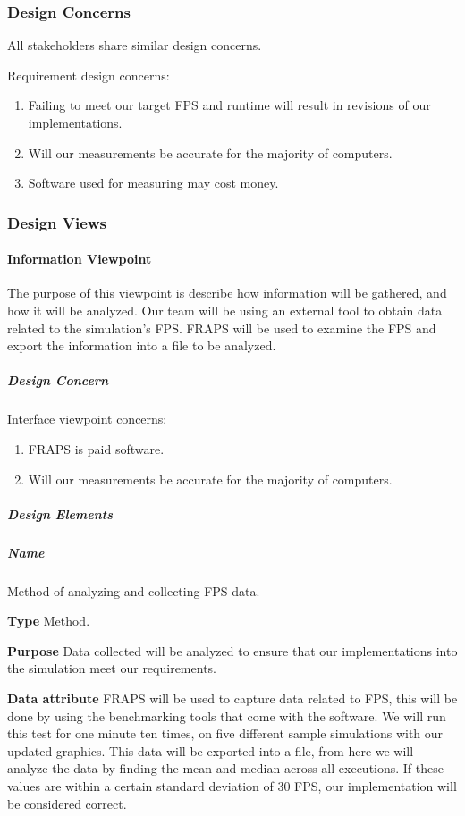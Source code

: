 \begin{flushleft}
\subsubsection{Design Concerns}
All stakeholders share similar design concerns.

Requirement design concerns:
\begin{enumerate}
\item Failing to meet our target FPS and runtime will result in revisions of our implementations.
\item Will our measurements be accurate for the majority of computers.
\item Software used for measuring may cost money.
\end{enumerate}

\newpage

\subsubsection{Design Views}
\paragraph{Information Viewpoint}
The purpose of this viewpoint is describe how information will be gathered, and how it will be analyzed.
Our team will be using an external tool to obtain data related to the simulation's FPS.
 FRAPS will be used to examine the FPS and export the information into a file to be analyzed.

\subparagraph{Design Concern}
Interface viewpoint concerns:
\begin{enumerate}
\item FRAPS is paid software.
\item Will our measurements be accurate for the majority of computers.
\end{enumerate}

\subparagraph{Design Elements}
\subparagraph{Name}
Method of analyzing and collecting FPS data.

\textbf{Type}
Method.

\textbf{Purpose}
Data collected will be analyzed to ensure that our implementations into the simulation meet our requirements.

\textbf{Data attribute}
FRAPS will be used to capture data related to FPS, this will be done by using the benchmarking tools that come with the software.
We will run this test for one minute ten times, on five different sample simulations with our updated graphics.
This data will be exported into a file, from here we will analyze the data by finding the mean and median across all executions.
If these values are within a certain standard deviation of 30 FPS, our implementation will be considered correct.


\end{flushleft}
